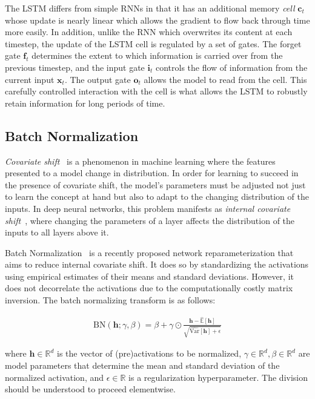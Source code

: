 \documentclass{article} %
\newcommand{\vect}[1]{\mathbf{#1}}
\newcommand{\ewprod}{\odot}
\newcommand{\reals}{\mathbb{R}}
\begin{document}
The LSTM differs from simple RNNs in that it has an additional memory \emph{cell} 
$\vect{c}_t$ whose update is nearly linear which allows the gradient to flow back 
through time more easily. In addition, unlike the RNN which overwrites its content 
at each timestep, the update of the LSTM cell is regulated by a set of gates.
The forget gate $\vect{f}_t$ determines the extent to which information is carried over from the previous timestep,
and the input gate $\vect{i}_t$ controls the flow of information from the current input $\vect{x}_t$.
The output gate $\vect{o}_t$ allows the model to read from the cell. This carefully 
controlled interaction with the cell is what allows the LSTM to robustly retain 
information for long periods of time.

\subsection{Batch Normalization}

\emph{Covariate shift}~\citep{shimodaira2000improving} is a phenomenon in machine learning where
the features presented to a model change in distribution.
In order for learning to succeed in the presence of covariate shift,
the model's parameters must be adjusted not just to learn the concept at hand
but also to adapt to the changing distribution of the inputs.
In deep neural networks, this problem manifests as \emph{internal covariate shift}~\citep{batchnorm},
where changing the parameters of a layer affects the distribution of the inputs to all layers above it.

Batch Normalization~\citep{batchnorm} is a recently proposed network reparameterization that aims to reduce internal covariate shift.
It does so by standardizing the activations using empirical estimates of their means and standard deviations.
However, it does not decorrelate the activations due to the computationally costly matrix inversion.
The batch normalizing transform is as follows:

\begin{align}
\mathrm{BN}(\vect{h}; \gamma, \beta) =
  \beta + \gamma \ewprod
  \frac{\vect{h} -   \widehat{\mathbb{E  }}[\vect{h}]}
       {       \sqrt{\widehat{\mathrm{Var}}[\vect{h}] + \epsilon}}
\end{align}

where $\vect{h} \in \reals^d$ is the vector of (pre)activations to be normalized, 
$\gamma \in \reals^d, \beta \in \reals^d$ are model parameters that determine the 
mean and standard deviation of the normalized activation, and $\epsilon \in \reals$ 
is a regularization hyperparameter. The division should be understood to proceed elementwise.
\end{document}
